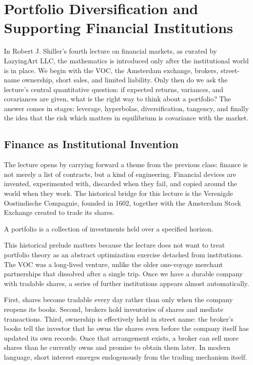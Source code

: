 \chapter{Portfolio Diversification and Supporting Financial Institutions}

In Robert J. Shiller's fourth lecture on financial markets, as curated by LazyingArt LLC, the mathematics is introduced only after the institutional world is in place. We begin with the VOC, the Amsterdam exchange, brokers, street-name ownership, short sales, and limited liability. Only then do we ask the lecture's central quantitative question: if expected returns, variances, and covariances are given, what is the right way to think about a portfolio? The answer comes in stages: leverage, hyperbolas, diversification, tangency, and finally the idea that the risk which matters in equilibrium is covariance with the market.

\section{Finance as Institutional Invention}

The lecture opens by carrying forward a theme from the previous class: finance is not merely a list of contracts, but a kind of engineering. Financial devices are invented, experimented with, discarded when they fail, and copied around the world when they work. The historical bridge for this lecture is the Verenigde Oostindische Compagnie, founded in 1602, together with the Amsterdam Stock Exchange created to trade its shares.

\begin{definition}
A portfolio is a collection of investments held over a specified horizon.
\end{definition}

This historical prelude matters because the lecture does not want to treat portfolio theory as an abstract optimization exercise detached from institutions. The VOC was a long-lived venture, unlike the older one-voyage merchant partnerships that dissolved after a single trip. Once we have a durable company with tradable shares, a series of further institutions appears almost automatically.

First, shares become tradable every day rather than only when the company reopens its books. Second, brokers hold inventories of shares and mediate transactions. Third, ownership is effectively held in street name: the broker's books tell the investor that he owns the shares even before the company itself has updated its own records. Once that arrangement exists, a broker can sell more shares than he currently owns and promise to obtain them later. In modern language, short interest emerges endogenously from the trading mechanism itself.

